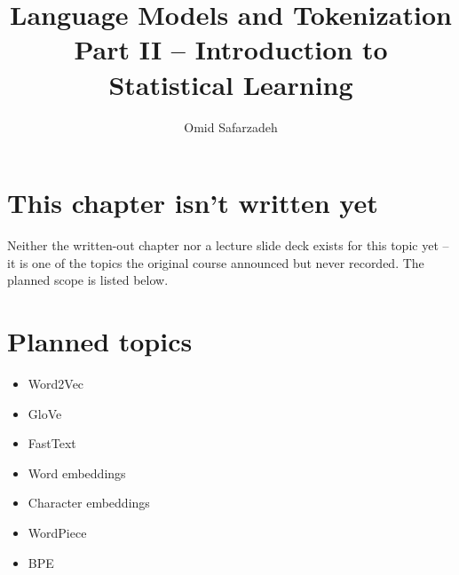 \documentclass[11pt]{article}
\title{Language Models and Tokenization \\ \large Part II -- Introduction to Statistical Learning}
\author{Omid Safarzadeh}
\date{}
\begin{document}
\maketitle

\section*{This chapter isn't written yet}
Neither the written-out chapter nor a lecture slide deck exists for this
topic yet -- it is one of the topics the original course announced but
never recorded. The planned scope is listed below.



\section*{Planned topics}
\begin{itemize}
  \item Word2Vec
  \item GloVe
  \item FastText
  \item Word embeddings
  \item Character embeddings
  \item WordPiece
  \item BPE
\end{itemize}
\end{document}
